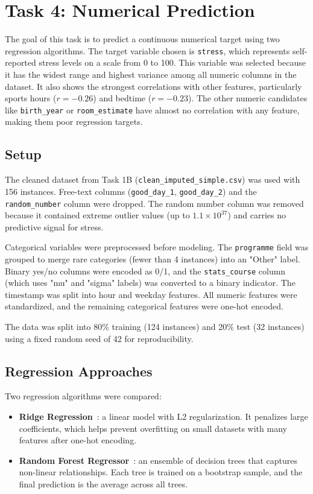 \section{Task 4: Numerical Prediction}

The goal of this task is to predict a continuous numerical target using two regression algorithms. The target variable chosen is \texttt{stress}, which represents self-reported stress levels on a scale from 0 to 100. This variable was selected because it has the widest range and highest variance among all numeric columns in the dataset. It also shows the strongest correlations with other features, particularly sports hours ($r = -0.26$) and bedtime ($r = -0.23$). The other numeric candidates like \texttt{birth\_year} or \texttt{room\_estimate} have almost no correlation with any feature, making them poor regression targets.

\subsection*{Setup}

The cleaned dataset from Task 1B (\texttt{clean\_imputed\_simple.csv}) was used with 156 instances. Free-text columns (\texttt{good\_day\_1}, \texttt{good\_day\_2}) and the \texttt{random\_number} column were dropped. The random number column was removed because it contained extreme outlier values (up to $1.1 \times 10^{37}$) and carries no predictive signal for stress.

Categorical variables were preprocessed before modeling. The \texttt{programme} field was grouped to merge rare categories (fewer than 4 instances) into an "Other" label. Binary yes/no columns were encoded as 0/1, and the \texttt{stats\_course} column (which uses "mu" and "sigma" labels) was converted to a binary indicator. The timestamp was split into hour and weekday features. All numeric features were standardized, and the remaining categorical features were one-hot encoded.

The data was split into 80\% training (124 instances) and 20\% test (32 instances) using a fixed random seed of 42 for reproducibility.

\subsection*{Regression Approaches}

Two regression algorithms were compared:

\begin{itemize}
    \item \textbf{Ridge Regression}~\cite{hoerl_1970}: a linear model with L2 regularization. It penalizes large coefficients, which helps prevent overfitting on small datasets with many features after one-hot encoding.
    \item \textbf{Random Forest Regressor}~\cite{breiman_2001}: an ensemble of decision trees that captures non-linear relationships. Each tree is trained on a bootstrap sample, and the final prediction is the average across all trees.
\end{itemize}

